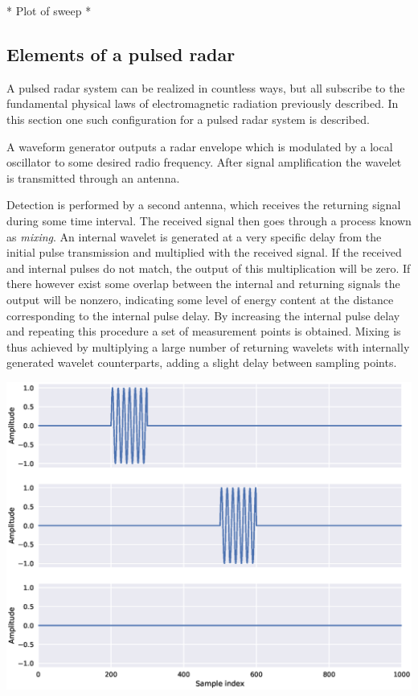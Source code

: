 * Plot of sweep *

\subsection{Elements of a pulsed radar}

A pulsed radar system can be realized in countless ways, but all subscribe to the fundamental physical laws of electromagnetic radiation previously described. In this section one such configuration for a pulsed radar system is described.

A waveform generator outputs a radar envelope which is modulated by a local oscillator to some desired radio frequency. After signal amplification the wavelet is transmitted through an antenna. 

Detection is performed by a second antenna, which receives the returning signal during some time interval. The received signal then goes through a process known as \emph{mixing}. An internal wavelet is generated at a very specific delay from the initial pulse transmission and multiplied with the received signal. If the received and internal pulses do not match, the output of this multiplication will be zero. If there however exist some overlap between the internal and returning signals the output will be nonzero, indicating some level of energy content at the distance corresponding to the internal pulse delay. By increasing the internal pulse delay and repeating this procedure a set of measurement points is obtained. Mixing is thus achieved by multiplying a large number of returning wavelets with internally generated wavelet counterparts, adding a slight delay between sampling points. 


\includegraphics[scale=0.5]{figs_temp/mixing0}


